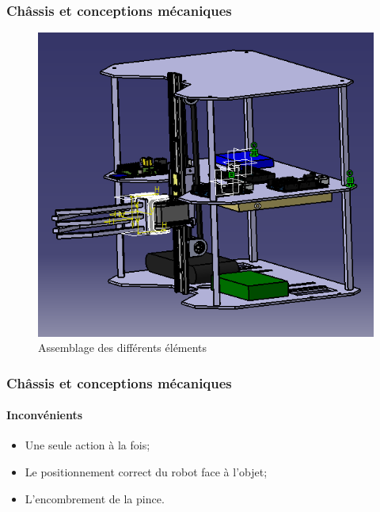 \begin{frame}
\frametitle{Châssis et conceptions mécaniques}
\begin{figure}[!ht]
	\includegraphics[scale=0.5]{assemblage.png}
	\caption{Assemblage des différents éléments} 
\end{figure}
\end{frame}

\begin{frame}
\frametitle{Châssis et conceptions mécaniques}
\framesubtitle{Inconvénients}
\begin{itemize}
	\item Une seule action à la fois;
	\item Le positionnement correct du robot face à l'objet;
	\item L'encombrement de la pince.
\end{itemize}
\end{frame}
